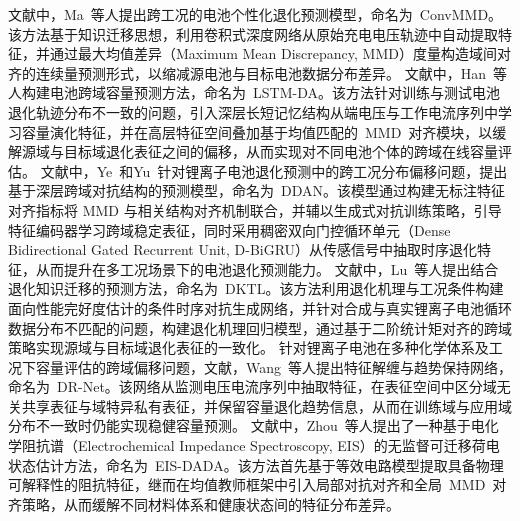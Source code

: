 文献\cite{9788003}中，Ma~等人提出跨工况的电池个性化退化预测模型，命名为~ConvMMD。该方法基于知识迁移思想，利用卷积式深度网络从原始充电电压轨迹中自动提取特征，并通过最大均值差异（Maximum Mean Discrepancy, MMD）度量构造域间对齐的连续量预测形式，以缩减源电池与目标电池数据分布差异。
文献\cite{HAN2022230823}中，Han~等人构建电池跨域容量预测方法，命名为~LSTM-DA。该方法针对训练与测试电池退化轨迹分布不一致的问题，引入深层长短记忆结构从端电压与工作电流序列中学习容量演化特征，并在高层特征空间叠加基于均值匹配的~MMD~对齐模块，以缓解源域与目标域退化表征之间的偏移，从而实现对不同电池个体的跨域在线容量评估。
文献\cite{9560040}中，Ye~和Yu~针对锂离子电池退化预测中的跨工况分布偏移问题，提出基于深层跨域对抗结构的预测模型，命名为~DDAN。该模型通过构建无标注特征对齐指标将 MMD 与相关结构对齐机制联合，并辅以生成式对抗训练策略，引导特征编码器学习跨域稳定表征，同时采用稠密双向门控循环单元（Dense Bidirectional Gated Recurrent Unit, D-BiGRU）从传感信号中抽取时序退化特征，从而提升在多工况场景下的电池退化预测能力。
文献\cite{10029904}中，Lu~等人提出结合退化知识迁移的预测方法，命名为~DKTL。该方法利用退化机理与工况条件构建面向性能完好度估计的条件时序对抗生成网络，并针对合成与真实锂离子电池循环数据分布不匹配的问题，构建退化机理回归模型，通过基于二阶统计矩对齐的跨域策略实现源域与目标域退化表征的一致化。
针对锂离子电池在多种化学体系及工况下容量评估的跨域偏移问题，文献\cite{WANG2023108897}，Wang~等人提出特征解缠与趋势保持网络，命名为~DR-Net。该网络从监测电压电流序列中抽取特征，在表征空间中区分域无关共享表征与域特异私有表征，并保留容量退化趋势信息，从而在训练域与应用域分布不一致时仍能实现稳健容量预测。
%
文献\cite{zhou2026eis_dada}中，Zhou~等人提出了一种基于电化学阻抗谱（Electrochemical Impedance Spectroscopy, EIS）的无监督可迁移荷电状态估计方法，命名为~EIS-DADA。该方法首先基于等效电路模型提取具备物理可解释性的阻抗特征，继而在均值教师框架中引入局部对抗对齐和全局~MMD~对齐策略，从而缓解不同材料体系和健康状态间的特征分布差异。

